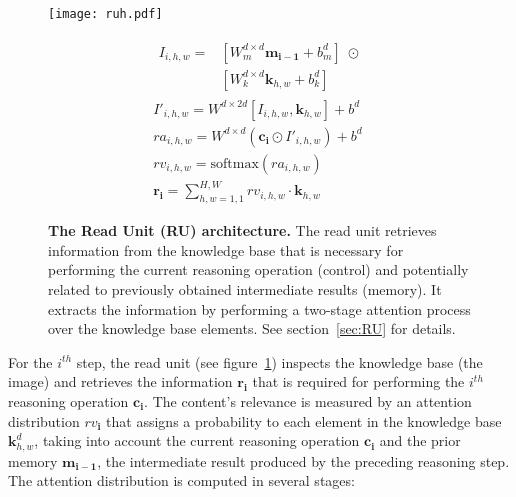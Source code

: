 \documentclass[fleqn]{article}
\newcommand{\figref}[1]{figure~\ref{fig:#1}}
\newcommand{\secref}[1]{section~\ref{sec:#1}}
\begin{document}
\begin{figure}[t]
\centering

\begin{minipage}{0.6\textwidth}
\noindent
\vspace*{0pt}
\hspace*{-12pt}
\texttt{[image: ruh.pdf]}
\end{minipage}
\hspace*{-45pt}
\begin{minipage}{0.5\textwidth}
\noindent
\footnotesize
\begin{subequations}
\begin{gather}
\begin{split}
I_{i,h,w} = & [W_m^{d\times d}\boldsymbol{m_{i-1}} + b_m^d] \; \odot \\[2pt]
& [W_k^{d\times d}{{\boldsymbol{k}_{h,w}}} + b_k^d]
\end{split}\tag{r1} \\[5pt]
{{{I'_{i,h,w}}}} = W^{d\times 2d}\left[ {{I_{i,h,w}}},{\boldsymbol{k}_{h,w}} \right] + b^d\tag{r2} \\[3pt]
{{\mathit{ra}_{i,h,w}}} = W^{d\times d}({\boldsymbol{c_i} \odot {{{I'_{i,h,w}}}}}) + b^d\tag{r3.1}  \\[5pt]
{{\mathit{rv}_{i,h,w}}} = \textrm{softmax}({{\mathit{ra}_{i,h,w}}})\tag{r3.2} \\[-0.5pt]
\boldsymbol{r_i} = \sum\limits_{h,w = 1,1}^{H,W} {\mathit{rv}_{i,h,w}}\tag{r3.3}  \cdot {\boldsymbol{k}_{h,w}}  
\end{gather}
\end{subequations}
\end{minipage}

\caption{\textbf{The Read Unit (RU) architecture.} The read unit retrieves information from the knowledge base that is necessary for performing the current reasoning operation (control) and potentially related to previously obtained intermediate results (memory). It extracts the information by performing a two-stage attention process over the knowledge base elements. See \secref{RU} for details.}

\label{fig:read}
\end{figure}



For the \(i^{th}\) step, the read unit (see \figref{read}) inspects the knowledge base (the image) and retrieves the information \(\boldsymbol{r_i}\) that is required for performing the \(i^{th}\) reasoning operation \(\boldsymbol{c_i}\). The content's relevance is measured by an attention distribution \(\boldsymbol{\mathit{rv}_i}\) that assigns a probability to each element in the knowledge base \({\boldsymbol{k}_{h,w}^d}\), taking into account the current reasoning operation \(\boldsymbol{c_i}\) and the prior memory \(\boldsymbol{m_{i-1}}\), the intermediate result produced by the preceding reasoning step. The attention distribution is computed in several stages:
\end{document}
